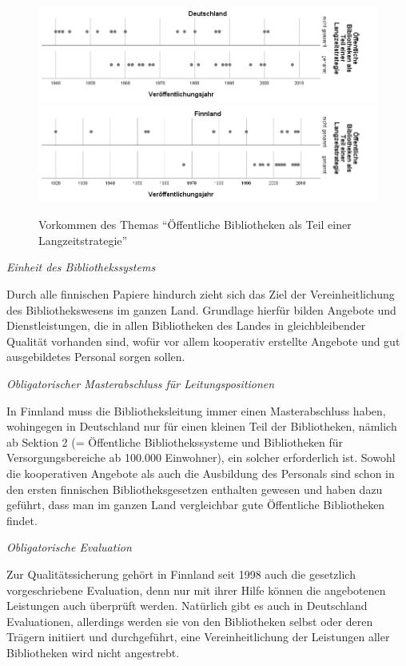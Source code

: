 \documentclass[a4paper,
fontsize=11pt,
oneside,
numbers=noperiodatend,
parskip=half-,
bibliography=totoc,
final
]{scrartcl}
\begin{document}
\begin{figure}
\centering
\includegraphics{img/abb_1_de.png} 
\includegraphics{img/abb_1_fin.png}
\caption{Vorkommen des Themas \enquote{Öffentliche Bibliotheken als Teil einer Langzeitstrategie}}
\end{figure}

\emph{Einheit des Bibliothekssystems}

Durch alle finnischen Papiere hindurch zieht sich das Ziel der
Vereinheitlichung des Bibliothekswesens im ganzen Land. Grundlage
hierfür bilden Angebote und Dienstleistungen, die in allen Bibliotheken
des Landes in gleichbleibender Qualität vorhanden sind, wofür vor allem
kooperativ erstellte Angebote und gut ausgebildetes Personal sorgen
sollen.

\emph{Obligatorischer Masterabschluss für Leitungspositionen}

In Finnland muss die Bibliotheksleitung immer einen Masterabschluss
haben, wohingegen in Deutschland nur für einen kleinen Teil der
Bibliotheken, nämlich ab Sektion 2 (= Öffentliche Bibliothekssysteme und
Bibliotheken für Versorgungsbereiche ab 100.000 Einwohner), ein solcher
erforderlich ist. Sowohl die kooperativen Angebote als auch die
Ausbildung des Personals sind schon in den ersten finnischen
Bibliotheksgesetzen enthalten gewesen und haben dazu geführt, dass man
im ganzen Land vergleichbar gute Öffentliche Bibliotheken findet.

\emph{Obligatorische Evaluation}

Zur Qualitätssicherung gehört in Finnland seit 1998 auch die gesetzlich
vorgeschriebene Evaluation, denn nur mit ihrer Hilfe können die
angebotenen Leistungen auch überprüft werden. Natürlich gibt es auch in
Deutschland Evaluationen, allerdings werden sie von den Bibliotheken
selbst oder deren Trägern initiiert und durchgeführt, eine
Vereinheitlichung der Leistungen aller Bibliotheken wird nicht
angestrebt.
\end{document}
